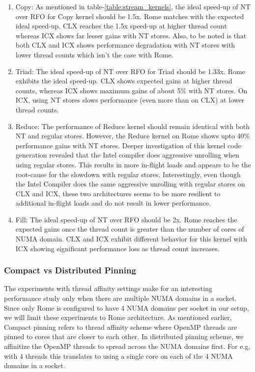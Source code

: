 \documentclass{article}
\begin{document}
\begin{enumerate}
\item Copy: As mentioned in table-\ref{table:stream_kernels}, the ideal speed-up of NT over RFO for Copy kernel should be 1.5x. Rome matches with the expected ideal speed-up. CLX reaches the 1.5x speed-up at higher thread count whereas ICX shows far lesser gains with NT stores. Also, to be noted is that both CLX and ICX shows performance degradation with NT stores with lower thread counts which isn't the case with Rome.
\item Triad: The ideal speed-up of NT over RFO for Triad should be 1.33x. Rome exhibits the ideal speed-up. CLX shows expected gains at higher thread counts, whereas ICX shows maximum gains of about 5\% with NT stores. On ICX, using NT stores slows  performance (even more than on CLX) at lower thread counts.
\item Reduce: The performance of Reduce kernel should remain identical with both NT and regular stores. However, the Reduce kernel on Rome shows upto 40\% performance gains with NT stores. Deeper investigation of this kernel code generation revealed that the Intel compiler does aggressive unrolling when using regular stores. This results in more in-flight loads and appears to be the root-cause for the slowdown with regular stores. Interestingly, even though the Intel Compiler does the same aggressive unrolling with regular stores on CLX and ICX, these two architectures seems to be more resilient to additional in-flight loads and do not result in lower performance.
\item Fill: The ideal speed-up of NT over RFO should be 2x. Rome reaches the expected gains once the thread count is greater than the number of cores of NUMA domain. CLX and ICX exhibit different behavior for this kernel with ICX showing significant performance loss as thread count increases.
\end{enumerate}


\subsubsection{Compact vs Distributed Pinning}
The experiments with thread affinity settings make for an interesting performance study only when there are multiple NUMA domains in a socket. Since only Rome is configured to have 4 NUMA domains per socket in our setup, we will limit these experiments to Rome architecture. As mentioned earlier, Compact pinning refers to thread affinity scheme where OpenMP threads are pinned to cores that are closer to each other. In distributed pinning scheme, we affinitize the OpenMP threads to spread across the NUMA domains first. For e.g, with 4 threads this translates to using a single core on each of the 4 NUMA domains in a socket.
\end{document}
